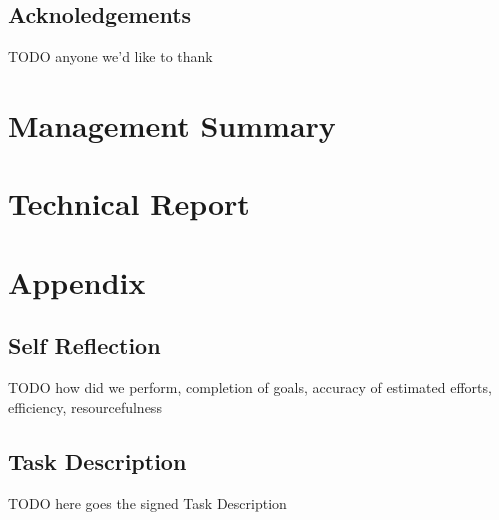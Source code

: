 \documentclass[a4paper]{report}
\begin{document}
\chapter*{Acknoledgements}
TODO anyone we'd like to thank

\tableofcontents
\listoffigures
\listoftables
\lstlistoflistings

\pagebreak
{}
\setcounter{page}{1}

\part{Management Summary}\label{part:mgmtsummary}


\part{Technical Report}







\printbibliography
\printglossaries

\appendix
\part{Appendix}
\chapter{Self Reflection}
TODO how did we perform, completion of goals, accuracy of estimated efforts, efficiency, resourcefulness

\chapter{Task Description}\label{ch:task-desc}
TODO here goes the signed Task Description\\
%

\end{document}
